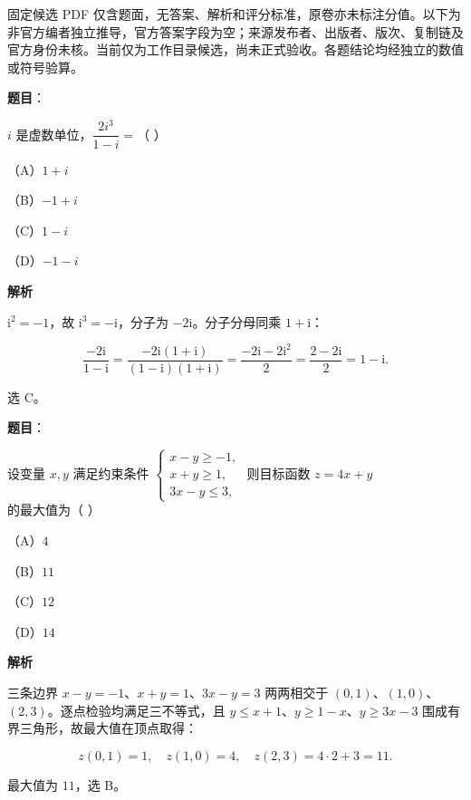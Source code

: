 

\begin{gktip}
固定候选 PDF 仅含题面，无答案、解析和评分标准，原卷亦未标注分值。以下为非官方编者独立推导，官方答案字段为空；来源发布者、出版者、版次、复制链及官方身份未核。当前仅为工作目录候选，尚未正式验收。各题结论均经独立的数值或符号验算。
\end{gktip}

\begin{answer}

\textbf{题目}：

$i$ 是虚数单位，$\dfrac{2i^3}{1-i}=$（ ）

（A）$1+i$

（B）$-1+i$

（C）$1-i$

（D）$-1-i$

\textbf{解析}

$\mathrm i^2=-1$，故 $\mathrm i^3=-\mathrm i$，分子为 $-2\mathrm i$。分子分母同乘 $1+\mathrm i$：

\nopagebreak[4]
\[\frac{-2\mathrm i}{1-\mathrm i}=\frac{-2\mathrm i(1+\mathrm i)}{(1-\mathrm i)(1+\mathrm i)}=\frac{-2\mathrm i-2\mathrm i^2}{2}=\frac{2-2\mathrm i}{2}=1-\mathrm i.\]

选 C。


\end{answer}
\begin{answer}

\textbf{题目}：

设变量 $x,y$ 满足约束条件 $\begin{cases}x-y\geqslant -1,\\ x+y\geqslant 1,\\ 3x-y\leqslant 3,\end{cases}$ 则目标函数 $z=4x+y$ 的最大值为（ ）

（A）$4$

（B）$11$

（C）$12$

（D）$14$

\textbf{解析}

三条边界 $x-y=-1$、$x+y=1$、$3x-y=3$ 两两相交于 $(0,1)$、$(1,0)$、$(2,3)$。逐点检验均满足三不等式，且 $y\le x+1$、$y\ge 1-x$、$y\ge 3x-3$ 围成有界三角形，故最大值在顶点取得：

\nopagebreak[4]
\[z(0,1)=1,\quad z(1,0)=4,\quad z(2,3)=4\cdot2+3=11 .\]

最大值为 $11$，选 B。


\end{answer}
